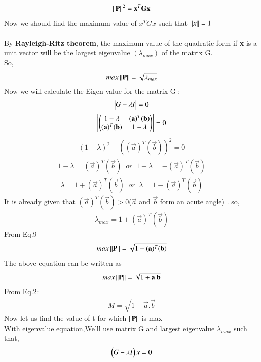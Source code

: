 \documentclass[journal]{IEEEtran}
\theoremstyle{remark}
\begin{document}
\begin{align}
\norm{\Vec{P}}^2=\Vec{x}^T\vec{G}\Vec{x}
  \end{align}
Now we should find the maximum value of \textbf{$x^TGx$} such that $\left\lVert x\right\rVert=1$\\\\
By \textbf{Rayleigh-Ritz theorem}, the maximum value of the quadratic form if \textbf{x} is a unit vector will be the largest eigenvalue $(\lambda_{max})$ of the matrix G.\\
So,
\begin{align}
    max\norm{\Vec{P}}=\sqrt{\lambda_{max}}
\end{align}
Now we will calculate the Eigen value for the matrix G :
\begin{align}
    \begin{vmatrix}G-\lambda I\end{vmatrix}=0
\end{align}
\begin{align}
    \mydet{\myvec{1-\lambda&(\Vec{a})^T(\Vec{b})\\(\Vec{a})^T(\Vec{b})&1-\lambda}}=0
\end{align}
\begin{align}
    (1-\lambda)^2-((\Vec{a})^T(\Vec{b}))^2=0
\end{align}
\begin{align}
    1-\lambda=(\Vec{a})^T(\Vec{b})\;\;or\;\;1-\lambda=-(\Vec{a})^T(\Vec{b})
\end{align}
\begin{align}
    \lambda=1+(\Vec{a})^T(\Vec{b})\;\;or \;\;\lambda=1-(\Vec{a})^T(\Vec{b})
\end{align}
It is already given that $(\Vec{a})^T(\Vec{b})>0 $($\Vec{a}$ and $\Vec{b}$ form an acute angle) . so,
\begin{align}
 \lambda_{max}=1+  (\Vec{a})^T(\Vec{b}) 
\end{align}
From Eq.9
\begin{align}
    max\norm{\Vec{P}}=\sqrt{1+  (\Vec{a})^T(\Vec{b}) }
\end{align}
The above equation can be written as
\begin{align}
   max \norm{\Vec{P}}=\sqrt{1+\Vec{a}.\Vec{b}}
\end{align}
From Eq.2:
\begin{align}
    M=\sqrt{1+\Vec{a}.\Vec{b}}
\end{align}
Now let us find the value of t for which $\norm{\Vec{P}}$ is max\\
With eigenvalue equation,We'll use matrix G and largest eigenvalue $\lambda_{max}$ such that,
\begin{align}
    \begin{pmatrix}G-\lambda I\end{pmatrix}x=0
\end{align}
\end{document}
